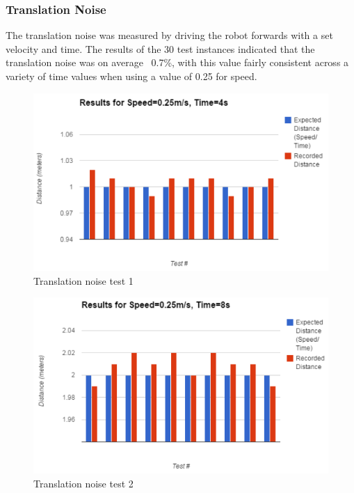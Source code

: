 \documentclass{article}
\begin{document}
	\subsubsection{Translation Noise}
	The translation noise was measured by driving the robot forwards with a set velocity and time. The results of the 30 test instances indicated that the translation noise was on average ~0.7\%, with this value fairly consistent across a variety of time values when using a value of 0.25 for speed.
	\begin{figure}[H]
	\begin{center}
	\includegraphics[width=0.9\linewidth]{ExperimentalResults1}
	\caption{Translation noise test 1}
	\end{center}
	\end{figure}
	\begin{figure}[H]
	\begin{center}
	\includegraphics[width=0.9\linewidth]{ExperimentalResults2}
	\caption{Translation noise test 2}
	\end{center}
	\end{figure}
\end{document}
